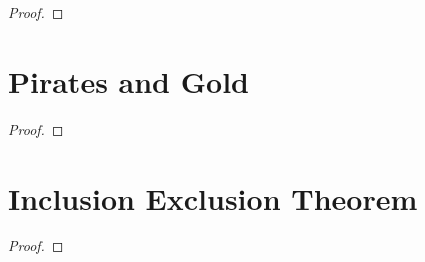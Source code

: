         \begin{corollary}
        \end{corollary}
        \begin{proof}
        \end{proof}
    \section{Pirates and Gold}
        \begin{theorem}
        \end{theorem}
        \begin{proof}
        \end{proof}
    \section{Inclusion Exclusion Theorem}
        \begin{theorem}
        \end{theorem}
        \begin{proof}
        \end{proof}
